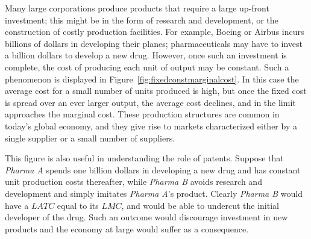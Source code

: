 Many large corporations produce products that require a large up-front investment; this might be in the form of research and development, or the construction of costly production facilities. For example, Boeing or Airbus incurs billions of dollars in developing their planes; pharmaceuticals may have to invest a billion dollars to develop a new drug. However, once such an investment is complete, the cost of producing each unit of output may be constant. Such a phenomenon is displayed in Figure~\ref{fig:fixedconstmarginalcost}. In this case the average cost for a small number of units produced is high, but once the fixed cost is spread over an ever larger output, the average cost declines, and in the limit approaches the marginal cost. These production structures are common in today's global economy, and they give rise to markets characterized either by a single supplier or a small number of suppliers.



This figure is also useful in understanding the role of patents. Suppose that \textit{Pharma A} spends one billion dollars in developing a new drug and has constant unit production costs thereafter, while \textit{Pharma B} avoids research and development and simply imitates \textit{Pharma A}'s product. Clearly \textit{Pharma B} would have a $LATC$ equal to its $LMC$, and would be able to undercut the initial developer of the drug. Such an outcome would discourage investment in new products and the economy at large would suffer as a consequence. 